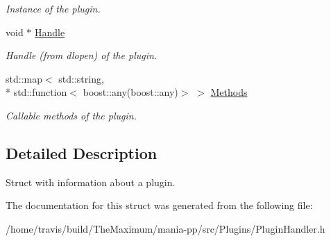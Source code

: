 \begin{DoxyCompactItemize}
\begin{DoxyCompactList}\small\item\em Instance of the plugin. \end{DoxyCompactList}\item 
\hypertarget{structPluginInfo_a3fc5df25e8b7e3b63bd0e92f270364f2}{void $\ast$ \hyperlink{structPluginInfo_a3fc5df25e8b7e3b63bd0e92f270364f2}{Handle}}\label{structPluginInfo_a3fc5df25e8b7e3b63bd0e92f270364f2}

\begin{DoxyCompactList}\small\item\em Handle (from dlopen) of the plugin. \end{DoxyCompactList}\item 
\hypertarget{structPluginInfo_a4fda3e831fda01ac915ce3a5dbcefcfd}{std\-::map$<$ std\-::string, \\*
std\-::function$<$ boost\-::any(boost\-::any)$>$ $>$ \hyperlink{structPluginInfo_a4fda3e831fda01ac915ce3a5dbcefcfd}{Methods}}\label{structPluginInfo_a4fda3e831fda01ac915ce3a5dbcefcfd}

\begin{DoxyCompactList}\small\item\em Callable methods of the plugin. \end{DoxyCompactList}\end{DoxyCompactItemize}


\subsection{Detailed Description}
Struct with information about a plugin. 

The documentation for this struct was generated from the following file\-:\begin{DoxyCompactItemize}
\item 
/home/travis/build/\-The\-Maximum/mania-\/pp/src/\-Plugins/Plugin\-Handler.\-h\end{DoxyCompactItemize}
